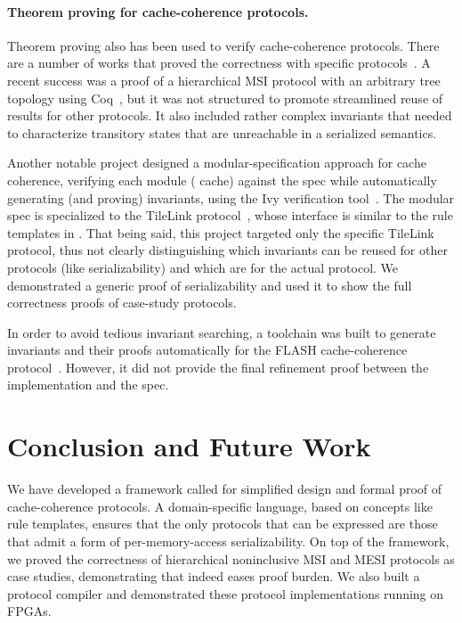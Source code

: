 \documentclass[sigplan,10pt,review,anonymous,screen]{acmart}\settopmatter{printfolios=true,printccs=false,printacmref=false}
\begin{document}
\paragraph{Theorem proving for cache-coherence protocols.}


Theorem proving also has been used to verify cache-coherence protocols.
There are a number of works that proved the correctness with specific protocols~\cite{Park:1996,Moore:1998}.
A recent success was a proof of a hierarchical MSI protocol with an arbitrary tree topology using Coq~\cite{Murali:2015}, but it was not structured to promote streamlined reuse of results for other protocols.
It also included rather complex invariants that needed to characterize transitory states that are unreachable in a serialized semantics.

Another notable project designed a modular-specification approach for cache coherence, verifying each module (\ie{} cache) against the spec while automatically generating (and proving) invariants, using the Ivy verification tool~\cite{ivy:Padon:2016, McMillan:2016}.
The modular spec is specialized to the TileLink protocol~\cite{tilelink}, whose interface is similar to the rule templates in \hemiola{}.
That being said, this project targeted only the specific TileLink protocol, thus not clearly distinguishing which invariants can be reused for other protocols (like serializability) and which are for the actual protocol.
We demonstrated a generic proof of serializability and used it to show the full correctness proofs of case-study protocols.

In order to avoid tedious invariant searching, a toolchain was built to generate invariants and their proofs automatically for the FLASH cache-coherence protocol~\cite{Li:2018}.
However, it did not provide the final refinement proof between the implementation and the spec.

\section{Conclusion and Future Work}
\label{sec-conclusion}

We have developed a framework called \hemiola{} for simplified design and formal proof of cache-coherence protocols.
A domain-specific language, based on concepts like rule templates, ensures that the only protocols that can be expressed are those that admit a form of per-memory-access serializability.
On top of the framework, we proved the correctness of hierarchical noninclusive MSI and MESI protocols as case studies, demonstrating that \hemiola{} indeed eases proof burden.
We also built a protocol compiler and demonstrated these protocol implementations running on FPGAs.
\end{document}
